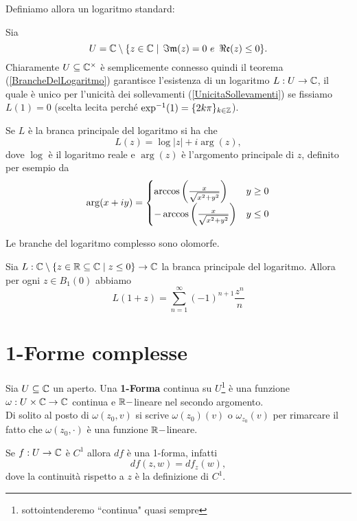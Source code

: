\begin{multicols*}{2}
\noindent
Definiamo allora un logaritmo standard:
\begin{definition}
Sia \[U=\C\bs\{z\in\C\mid \Imag(z)=0\ e\ \Real(z)\leq 0\}.\]
Chiaramente $U\subseteq\mathbb{C}^\times$ \`e semplicemente connesso quindi il teorema (\ref{BrancheDelLogaritmo}) garantisce l'esistenza di un logaritmo $L:U\to \mathbb{C}$, il quale \`e unico per l'unicit\`a dei sollevamenti (\ref{UnicitaSollevamenti}) se fissiamo $L(1)=0$ (scelta lecita perch\'e $\exp^{-1}(1)=\{2k\pi\}_{k\in\mathbb{Z}}$).
\end{definition}
\begin{proposition}
Se $L$ \`e la branca principale del logaritmo si ha che
\[L(z)=\log|z|+i\arg(z),\]
dove $\log$ \`e il logaritmo reale e $\arg(z)$ \`e l'argomento principale di $z$, definito per esempio da
\[\arg(x+iy)=\begin{cases}
\arccos\left(\frac x{\sqrt{x^2+y^2}}\right) & y\geq 0\\
-\arccos\left(\frac x{\sqrt{x^2+y^2}}\right) & y\leq 0
\end{cases}\]
\end{proposition}



\begin{proposition}\label{BrancheDelLogaritmoSonoOlomorfe}
Le branche del logaritmo complesso sono olomorfe.
\end{proposition}

\begin{theorem}\label{EspansioneInSerieDelLogaritmo}
Sia $L:\mathbb{C}\setminus\{z\in\mathbb{R}\subseteq\mathbb{C}\mid z\leq 0\}\to \mathbb{C}$ la branca principale del logaritmo. Allora per ogni $z\in B_1(0)$ abbiamo
\[L(1+z)=\sum_{n=1}^\infty(-1)^{n+1}\frac{z^n}{n}\]
\end{theorem}

\section{1-Forme complesse}
\begin{definition}
Sia $U\subseteq\mathbb{C}$ un aperto. Una \textbf{1-Forma} continua su $U$\footnote{sottointenderemo ``continua" quasi sempre} \`e una funzione $\omega:U\times \mathbb{C}\to \mathbb{C}$ continua e $\mathbb{R}-$lineare nel secondo argomento.\\
Di solito al posto di $\omega(z_0,v)$ si scrive $\omega(z_0)(v)$ o $\omega_{z_0}(v)$ per rimarcare il fatto che $\omega(z_0,\cdot)$ \`e una funzione $\mathbb{R}-$lineare.
\end{definition}
\begin{remark}
Se $f:U\to \mathbb{C}$ \`e $C^1$ allora $df$ \`e una 1-forma, infatti
\[df(z,w)=df_z(w),\]
dove la continuit\`a rispetto a $z$ \`e la definizione di $C^1$.
\end{remark}


\end{multicols*}
